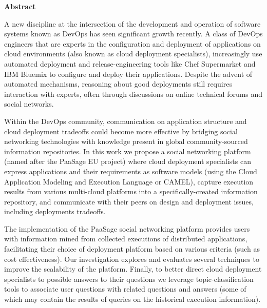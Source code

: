 \thispagestyle{empty}
\begin{titlepage}
\begin{center}
{\bf\Large Abstract}\\
\end{center}

\indent A new discipline at the intersection of the development and operation of software systems known as DevOps has seen significant growth recently. A class of DevOps engineers that are experts in the configuration and deployment of applications on cloud environments (also known as cloud deployment specialists), increasingly use automated deployment and release-engineering tools like Chef Supermarket and IBM Bluemix to configure and deploy their applications.  Despite the advent of automated mechanisms, reasoning about good deployments still requires interaction with experts, often through discussions on online technical forums and social networks. 

Within the DevOps community, communication on application structure and cloud deployment tradeoffs could become more effective by bridging social networking technologies with knowledge present in global community-sourced information repositories.  In this work we propose a social networking platform (named after the PaaSage EU project) where cloud deployment specialists can express applications and their requirements as software models (using the Cloud Application Modeling and Execution Language or CAMEL), capture execution results from various multi-cloud platforms into a specifically-created information repository, and communicate with their peers on design and deployment issues, including deployments tradeoffs.

The implementation of the PaaSage social networking platform provides users with information mined from collected executions of distributed applications, facilitating their choice of deployment platform based on various criteria (such as cost effectiveness). Our investigation explores and evaluates several techniques to improve the scalability of the platform.  Finally, to better direct cloud deployment specialists to possible answers to their questions we leverage topic-classification tools to associate user questions with related questions and answers (some of which may contain the results of queries on the historical execution information).
\vfill
\end{titlepage}

